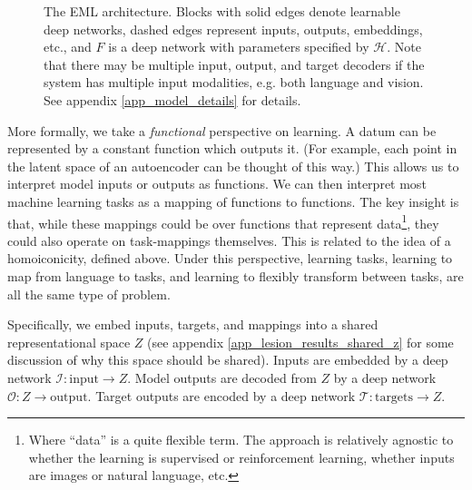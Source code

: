 \documentclass{article}
\begin{document}
\begin{figure}
\caption{The EML architecture. Blocks with solid edges denote learnable deep networks, dashed edges represent inputs, outputs, embeddings, etc., and $F$ is a deep network with parameters specified by $\mathcal{H}$. Note that there may be multiple input, output, and target decoders if the system has multiple input modalities, e.g. both language and vision. See appendix \ref{app_model_details} for details.} \label{architecture_fig}
\end{figure}
More formally, we take a \emph{functional} perspective on learning. A datum can be represented by a constant function which outputs it. (For example, each point in the latent space of an autoencoder can be thought of this way.) This allows us to interpret model inputs or outputs as functions. We can then interpret most machine learning tasks as a mapping of functions to functions. The key insight is that, while these mappings could be over functions that represent data\footnote{Where ``data'' is a quite flexible term. The approach is relatively agnostic to whether the learning is supervised or reinforcement learning, whether inputs are images or natural language, etc.}, they could also operate on task-mappings themselves. This is related to the idea of a homoiconicity, defined above. Under this perspective, learning tasks, learning to map from language to tasks, and learning to flexibly transform between tasks, are all the same type of problem. \par
Specifically, we embed inputs, targets, and mappings into a shared representational space $Z$ (see appendix \ref{app_lesion_results_shared_z} for some discussion of why this space should be shared). Inputs are embedded by a deep network $\mathcal{I}: \text{input} \rightarrow Z$. Model outputs are decoded from $Z$ by a deep network $\mathcal{O}: Z \rightarrow \text{output}$. Target outputs are encoded by a deep network $\mathcal{T}: \text{targets} \rightarrow Z$.\par
\end{document}
